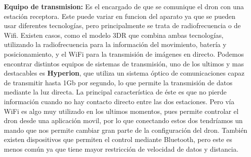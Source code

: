 \documentclass{article}
\begin{document}
\hspace{1 cm}\textbf{Equipo de transmision:} Es el encargado de que se comunique el dron con una estaci\'on receptora. Este puede variar en funcion del aparato ya que se pueden usar diferentes tecnolog\'ias, pero principalmente se trata de radiofrecuencia o de Wifi. Existen casos, como el modelo 3DR que combina ambas tecnolog\'ias, utilizando la radiofrecuencia para la informaci\'on del movimiento, bater\'ia y posicionamiento, y el WiFi para la transmisi\'on de im\'agenes en directo. Podemos encontrar distintos equipos de sistemas de transmisi\'on, uno de los ultimos y mas destacables es \textbf{Hyperion}, que utiliza un sistema \'optico de comunicaciones capaz de transmitir hasta 1Gb por segundo, lo que permite la transmisi\'on de datos mediante la luz directa. La principal caracter\'istica de \'este es que no pierde informaci\'on cuando no hay contacto directo entre las dos estaciones. Pero v\'ia WiFi es algo muy utilizado en los ultimos momentos, pues permite controlar el dron desde una aplicaci\'on movil, por lo que conectando estos dos tendr\'iamos un mando que nos permite cambiar gran parte de la configuraci\'on del dron. Tambi\'en existen dispositivos que permiten el control mediante Bluetooth, pero este es menos com\'un ya que tiene mayor restricci\'on de velocidad de datos y distancia. 
\end{document}
